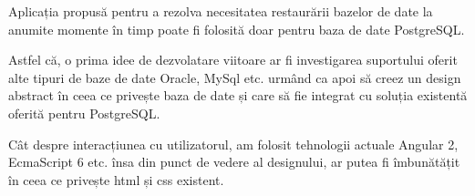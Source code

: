 Aplicația propusă pentru a rezolva necesitatea restaurării bazelor de date la anumite momente în timp poate fi folosită doar pentru baza de date PostgreSQL. 
\par
Astfel că, o prima idee de dezvolatare viitoare ar fi investigarea suportului oferit alte tipuri de baze de date Oracle, MySql etc. urmând ca apoi să creez un design abstract în ceea ce privește baza de date și care să fie integrat cu soluția existentă oferită pentru PostgreSQL.
\par
Cât despre interacțiunea cu utilizatorul, am folosit tehnologii actuale Angular 2, EcmaScript 6 etc. însa din punct de vedere al designului, ar putea fi îmbunătățit în ceea ce privește html și css existent.